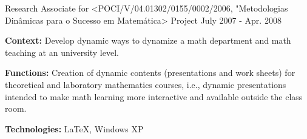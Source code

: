 \begin{cventries}
  \cventry    
    {Research Associate for <POCI/V/04.01302/0155/0002/2006, "Metodologias Din\^amicas para o Sucesso em Matem\'atica> Project} %
    {} %
    {} %
    {July 2007 - Apr. 2008} %
    {
      \begin{cvitems} %
		\item[] {\textbf{Context:} Develop dynamic ways to dynamize a math department and math teaching at an university level.
		}
		\item[] {\textbf{Functions:} Creation of dynamic contents (presentations and work sheets) for theoretical and laboratory mathematics courses, i.e., dynamic presentations intended to make math learning more interactive and available outside the class room.
		}
  		\item[] {\textbf{Technologies:} 
  		\textcolor{rainbowcolor-indigo}{LaTeX},  
  		\textcolor{rainbowcolor-orange}{Windows XP}}
      \end{cvitems}
    }  
     
\end{cventries}

\vspace{5.0cm}


